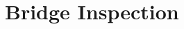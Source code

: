 \documentclass[12pt]{report}
\begin{document}
\chapter{Bridge Inspection}

%
%

%

%


\end{document}
